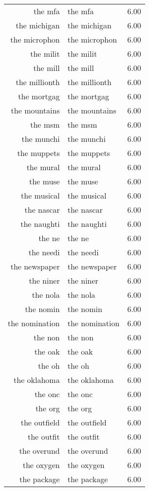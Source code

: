 \begin{table}[ht]
\begin{tabular}{rlr}
  the mfa & the mfa & 6.00 \\ 
  the michigan & the michigan & 6.00 \\ 
  the microphon & the microphon & 6.00 \\ 
  the milit & the milit & 6.00 \\ 
  the mill & the mill & 6.00 \\ 
  the millionth & the millionth & 6.00 \\ 
  the mortgag & the mortgag & 6.00 \\ 
  the mountains & the mountains & 6.00 \\ 
  the msm & the msm & 6.00 \\ 
  the munchi & the munchi & 6.00 \\ 
  the muppets & the muppets & 6.00 \\ 
  the mural & the mural & 6.00 \\ 
  the muse & the muse & 6.00 \\ 
  the musical & the musical & 6.00 \\ 
  the nascar & the nascar & 6.00 \\ 
  the naughti & the naughti & 6.00 \\ 
  the ne & the ne & 6.00 \\ 
  the needi & the needi & 6.00 \\ 
  the newspaper & the newspaper & 6.00 \\ 
  the niner & the niner & 6.00 \\ 
  the nola & the nola & 6.00 \\ 
  the nomin & the nomin & 6.00 \\ 
  the nomination & the nomination & 6.00 \\ 
  the non & the non & 6.00 \\ 
  the oak & the oak & 6.00 \\ 
  the oh & the oh & 6.00 \\ 
  the oklahoma & the oklahoma & 6.00 \\ 
  the onc & the onc & 6.00 \\ 
  the org & the org & 6.00 \\ 
  the outfield & the outfield & 6.00 \\ 
  the outfit & the outfit & 6.00 \\ 
  the overund & the overund & 6.00 \\ 
  the oxygen & the oxygen & 6.00 \\ 
  the package & the package & 6.00 \\ 

\end{tabular}
\end{table}
